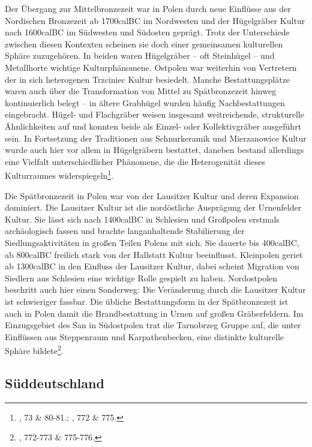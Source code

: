 \documentclass[openany,twoside,twocolumn]{book}
\let\rmarkdownfootnote\footnote%
\def\footnote{\protect\rmarkdownfootnote}
\begin{document}
Der Übergang zur Mittelbronzezeit war in Polen durch neue Einflüsse aus
der Nordischen Bronzezeit ab 1700calBC im Nordwesten und der Hügelgräber
Kultur nach 1600calBC im Südwesten und Südosten geprägt. Trotz der
Unterschiede zwischen diesen Kontexten scheinen sie doch einer
gemeinsamen kulturellen Sphäre zuzugehören. In beiden waren Hügelgräber
-- oft Steinhügel -- und Metallhorte wichtige Kulturphänomene. Ostpolen
war weiterhin von Vertretern der in sich heterogenen Trzciniec Kultur
besiedelt. Manche Bestattungsplätze waren auch über die Transformation
von Mittel zu Spätbronzezeit hinweg kontinuierlich belegt -- in ältere
Grabhügel wurden häufig Nachbestattungen eingebracht. Hügel- und
Flachgräber weisen insgesamt weitreichende, strukturelle Ähnlichkeiten
auf und konnten beide als Einzel- oder Kollektivgräber ausgeführt sein.
In Fortsetzung der Traditionen aus Schnurkeramik und Mierzanowice Kultur
wurde auch hier vor allem in Hügelgräbern bestattet, daneben bestand
allerdings eine Vielfalt unterschiedlicher Phänomene, die die
Heterogenität dieses Kulturraumes widerspiegeln\footnote{\textcite{dabrowski_aeltere_2004},
  73 \& 80-81.; \textcite{czebreszuk_bronze_2013}, 772 \& 775.}.

Die Spätbronzezeit in Polen war von der Lausitzer Kultur und deren
Expansion dominiert. Die Lausitzer Kultur ist die nordöstliche
Ausprägung der Urnenfelder Kultur. Sie lässt sich nach 1400calBC in
Schlesien und Großpolen erstmals archäologisch fassen und brachte
langanhaltende Stabilierung der Siedlungsaktivitäten in großen Teilen
Polens mit sich. Sie dauerte bis 400calBC, ab 800calBC freilich stark
von der Hallstatt Kultur beeinflusst. Kleinpolen geriet ab 1300calBC in
den Einfluss der Lausitzer Kultur, dabei scheint Migration von Siedlern
aus Schlesien eine wichtige Rolle gespielt zu haben. Nordostpolen
beschritt auch hier einen Sonderweg: Die Veränderung durch die Lausitzer
Kultur ist schwieriger fassbar. Die übliche Bestattungsform in der
Spätbronzezeit ist auch in Polen damit die Brandbestattung in Urnen auf
großen Gräberfeldern. Im Einzugsgebiet des San in Südostpolen trat die
Tarnobrzeg Gruppe auf, die unter Einflüssen aus Steppenraum und
Karpathenbecken, eine distinkte kulturelle Sphäre bildete\footnote{\textcite{czebreszuk_bronze_2013},
  772-773 \& 775-776.}.

\hypertarget{suddeutschland}{%
\subsection{Süddeutschland}\label{suddeutschland}}
\end{document}
